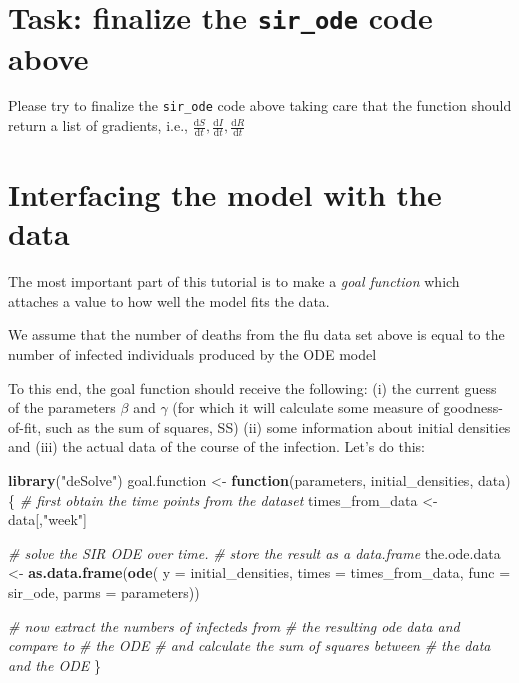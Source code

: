 \documentclass[
]{book}
\newenvironment{Shaded}{\begin{snugshade}}{\end{snugshade}}
\newcommand{\AttributeTok}[1]{\textcolor[rgb]{0.13,0.29,0.53}{#1}}
\newcommand{\CommentTok}[1]{\textcolor[rgb]{0.56,0.35,0.01}{\textit{#1}}}
\newcommand{\ControlFlowTok}[1]{\textcolor[rgb]{0.13,0.29,0.53}{\textbf{#1}}}
\newcommand{\FunctionTok}[1]{\textcolor[rgb]{0.13,0.29,0.53}{\textbf{#1}}}
\newcommand{\NormalTok}[1]{#1}
\newcommand{\OtherTok}[1]{\textcolor[rgb]{0.56,0.35,0.01}{#1}}
\newcommand{\StringTok}[1]{\textcolor[rgb]{0.31,0.60,0.02}{#1}}
\theoremstyle{definition}
\theoremstyle{definition}
\theoremstyle{definition}
\theoremstyle{definition}
\theoremstyle{remark}
\begin{document}
\section{\texorpdfstring{Task: finalize the \texttt{sir\_ode} code above}{Task: finalize the sir\_ode code above}}\label{task-finalize-the-sir_ode-code-above}

Please try to finalize the \texttt{sir\_ode} code above taking care that the function should return a list of gradients, i.e., \(\frac{\mathrm{d}S}{\mathrm{d}t},\frac{\mathrm{d}I}{\mathrm{d}t},\frac{\mathrm{d}R}{\mathrm{d}t}\)

\section{Interfacing the model with the data}\label{interfacing-the-model-with-the-data}

The most important part of this tutorial is to
make a \emph{goal function} which attaches a value to
how well the model fits the data.

We assume
that the number of deaths from the flu data
set above is equal
to the number of infected individuals produced
by the ODE model

To this end, the goal
function should receive the following: (i) the current guess of the parameters \(\beta\) and \(\gamma\)
(for which it will calculate some measure of goodness-of-fit, such as the sum of squares, SS)
(ii) some information about initial densities
and (iii) the actual data of the course of the infection.
Let's do this:

\begin{Shaded}
\begin{Highlighting}[]
\FunctionTok{library}\NormalTok{(}\StringTok{"deSolve"}\NormalTok{)}
\NormalTok{goal.function }\OtherTok{\textless{}{-}} \ControlFlowTok{function}\NormalTok{(parameters, initial\_densities, data)}
\NormalTok{\{}
  \CommentTok{\# first obtain the time points from the dataset}
\NormalTok{  times\_from\_data }\OtherTok{\textless{}{-}}\NormalTok{ data[,}\StringTok{"week"}\NormalTok{]}
  
  \CommentTok{\# solve the SIR ODE over time. }
  \CommentTok{\# store the result as a data.frame}
\NormalTok{  the.ode.data }\OtherTok{\textless{}{-}} \FunctionTok{as.data.frame}\NormalTok{(}\FunctionTok{ode}\NormalTok{(}
    \AttributeTok{y =}\NormalTok{ initial\_densities,}
    \AttributeTok{times =}\NormalTok{ times\_from\_data,}
    \AttributeTok{func =}\NormalTok{ sir\_ode, }\AttributeTok{parms =}\NormalTok{ parameters))}
     
  \CommentTok{\# now extract the numbers of infecteds from }
  \CommentTok{\# the resulting ode data and compare to }
  \CommentTok{\# the ODE}
  \CommentTok{\# and calculate the sum of squares between}
  \CommentTok{\# the data and the ODE}
\NormalTok{\}}
\end{Highlighting}
\end{Shaded}
\end{document}
